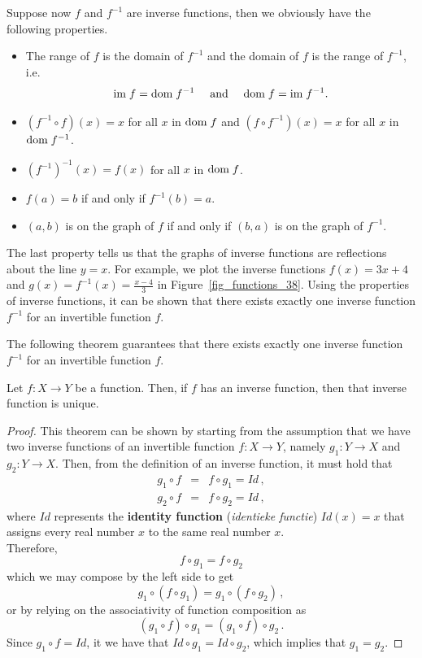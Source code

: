 \fi

Suppose now $f$ and $f^{-1}$ are inverse functions, then we obviously have the following properties.

\begin{itemize}

\item  The range of $f$ is the domain of $f^{-1}$ and the domain of $f$ is the range of $f^{-1}$, i.e.
$$
\text{im}{\;f}=\text{dom}{\;f^{-1}} \quad\text{ and }\quad \text{dom}{\;f}=\text{im}{\;f^{-1}}.
$$
\item $(f^{-1} \circ f)(x) = x$ for all $x$ in $\text{dom}{\;f}$ and $(f \circ f ^{-1})(x) = x$ for all $x$ in $\text{dom}{\;f^{-1}}$.

\item $\left(f^{-1}\right)^{-1}(x) = f(x)$ for all $x$ in $\text{dom}{\;f}$.


\item  $f(a) = b$ if and only if $f^{-1}(b) = a$.

\item  $(a,b)$ is on the graph of $f$ if and only if $(b,a)$ is on the graph of $f^{-1}$.

\end{itemize}

The last property tells us that the graphs of inverse functions are reflections about the line $y=x$. \ifvc For example, we plot the inverse functions $f(x) = 3x+4$ and $g(x) =f^{-1}(x)= \frac{x-4}{3}$ in Figure~\ref{fig_functions_38}. \fi  \ifcalculus Using the properties of inverse functions, it can be shown that there exists exactly one inverse function $f^{-1}$ for an invertible function $f$.\fi

\ifcourse
\ifanalysis

The following theorem guarantees that there exists exactly one inverse function $f^{-1}$ for an invertible function $f$.
\begin{theorem}
Let $f: X \to Y$ be a function. Then, if $f$ has an inverse function, then that inverse function is unique. 
\end{theorem}
\begin{proof}
This theorem can be shown by starting from the assumption that we have two inverse functions of an invertible function $f: X\to Y$, namely $g_1: Y\to X$ and $g_2: Y\to X$. Then, from the definition of an inverse function, it must hold that 
\begin{eqnarray*}
g_1 \circ f&=& f \circ g_1 = Id\,,\\
g_2 \circ f&=& f \circ g_2 = Id\,,
\end{eqnarray*}
where $Id$ represents the \textbf{identity function} (\textit{identieke functie}) $Id(x)=x$ that assigns every real number $x$ to the same real number $x$. \\
Therefore,
$$
f \circ g_1= f \circ g_2
$$
which we may compose by the left side to get
$$
g_1 \circ (f \circ g_1)=g_1 \circ (f \circ g_2)\,,
$$
or by relying on the associativity of function composition as
$$
(g_1 \circ f) \circ g_1=(g_1 \circ f) \circ g_2\,.
$$
Since $g_1\circ f=Id$, it we have that $Id\circ g_1=Id\circ g_2$, which implies that $g_1=g_2$.
\end{proof}

